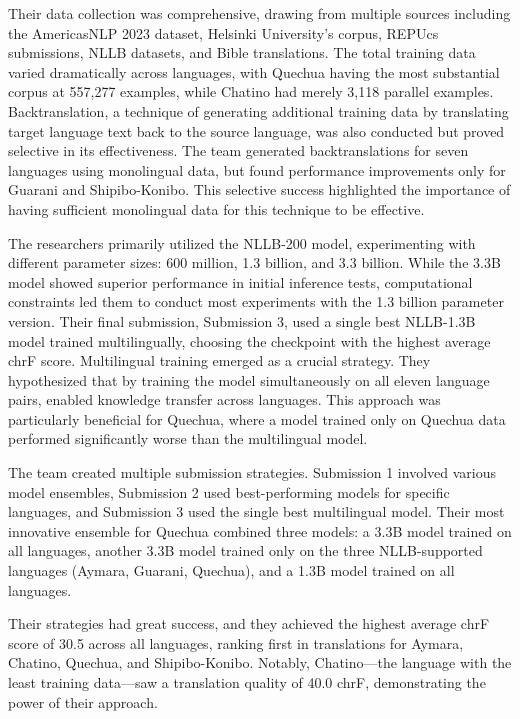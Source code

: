 Their data collection was comprehensive, drawing from multiple sources including the AmericasNLP 2023 dataset, Helsinki University's corpus, REPUcs submissions, NLLB datasets, and Bible translations. The total training data varied dramatically across languages, with Quechua having the most substantial corpus at 557,277 examples, while Chatino had merely 3,118 parallel examples. Backtranslation, a technique of generating additional training data by translating target language text back to the source language, was also conducted but proved selective in its effectiveness. The team generated backtranslations for seven languages using monolingual data, but found performance improvements only for Guarani and Shipibo-Konibo. This selective success highlighted the importance of having sufficient monolingual data for this technique to be effective.

The researchers primarily utilized the NLLB-200 model, experimenting with different parameter sizes: 600 million, 1.3 billion, and 3.3 billion. While the 3.3B model showed superior performance in initial inference tests, computational constraints led them to conduct most experiments with the 1.3 billion parameter version. Their final submission, Submission 3, used a single best NLLB-1.3B model trained multilingually, choosing the checkpoint with the highest average chrF score. Multilingual training emerged as a crucial strategy. They hypothesized that by training the model simultaneously on all eleven language pairs, enabled knowledge transfer across languages. This approach was particularly beneficial for Quechua, where a model trained only on Quechua data performed significantly worse than the multilingual model.

The team created multiple submission strategies. Submission 1 involved various model ensembles, Submission 2 used best-performing models for specific languages, and Submission 3 used the single best multilingual model. Their most innovative ensemble for Quechua combined three models: a 3.3B model trained on all languages, another 3.3B model trained only on the three NLLB-supported languages (Aymara, Guarani, Quechua), and a 1.3B model trained on all languages.

Their strategies had great success, and they achieved the highest average chrF score of 30.5 across all languages, ranking first in translations for Aymara, Chatino, Quechua, and Shipibo-Konibo. Notably, Chatino—the language with the least training data—saw a translation quality of 40.0 chrF, demonstrating the power of their approach.

